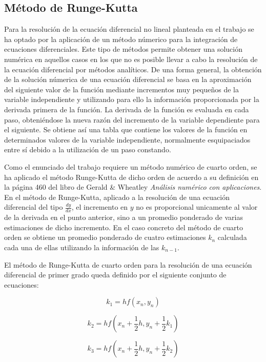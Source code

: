 \documentclass[11pt]{article}
\begin{document}
\subsection{Método de Runge-Kutta}
Para la resolución de la ecuación diferencial no lineal planteada en el trabajo se ha optado por la aplicación de un método númerico para la integración de ecuaciones diferenciales. Este tipo de métodos permite obtener una solución numérica en aquellos casos en los que no es posible llevar a cabo la resolución de la ecuación diferencial por métodos analíticos. De una forma general, la obtención de la solución númerica de una ecuación diferencial se basa en la aproximación del siguiente valor de la función mediante incrementos muy pequeños de la variable independiente y utilizando para ello la información proporcionada por la derivada primera de la función. La derivada de la función es evaluada en cada paso, obteniéndose la nueva razón del incremento de la variable dependiente para el siguiente. Se obtiene así una tabla que contiene los valores de la función en determinados valores de la variable independiente, normalmente esquipaciados entre sí debido a la utilización de un paso constando.

Como el enunciado del trabajo requiere un método numérico de cuarto orden, se ha aplicado el método Runge-Kutta de dicho orden de acuerdo a su definición en la página 460 del libro de Gerald \& Wheatley \textit{Análisis numérico con aplicaciones}. En el método de Runge-Kutta, aplicado a la resolución de una ecuación diferencial del tipo $\frac{dy}{dx}$, el incremento en $y$ no es proporcional unicamente al valor de la derivada en el punto anterior, sino a un promedio ponderado de varias estimaciones de dicho incremento. En el caso concreto del método de cuarto orden se obtiene un promedio ponderado de cuatro estimaciones $k_n$ calculada cada una de ellas utilizando la información de las $k_{n -1}$. 

El método de Runge-Kutta de cuarto orden para la resolución de una ecuación diferencial de primer grado queda definido por el siguiente conjunto de ecuaciones:

\begin{equation}
	k_1 = hf(x_n, y_n)
\end{equation}

\begin{equation}
	k_2 = hf(x_n + \frac{1}{2}h, y_n + \frac{1}{2}k_1)
\end{equation}

\begin{equation}
	k_3 = hf(x_n + \frac{1}{2}h, y_n + \frac{1}{2}k_2)
\end{equation}
\end{document}
